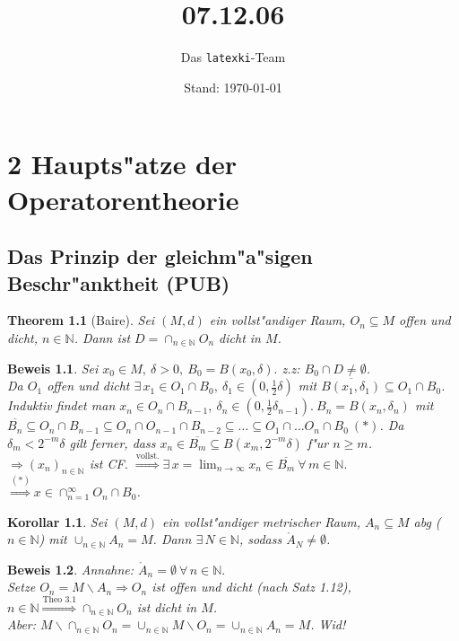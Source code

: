 \documentclass[a4paper,11pt]{book}
\title{07.12.06}
\author{Das \texttt{latexki}-Team\\[8 cm]}
\date{Stand: \today}
\newcommand{\N}{{\mathbb N}}
\newtheorem{Kor}[Def]{Korollar}
\newtheorem{Theo}[Def]{Theorem}
\theoremstyle{nonumberplain}
\newtheorem{Bew}{Beweis}
\begin{document}
\chapter{2 Haupts"atze der Operatorentheorie}

\section{Das Prinzip der gleichm"a"sigen Beschr"anktheit (PUB)}

\begin{Theo}[Baire]
Sei $(M,d)$ ein vollst"andiger Raum, $O_n \subseteq M$ offen und dicht, $n \in \N$. Dann ist $D = \cap_{n \in \N} O_n$ dicht in $M$.
\end{Theo}

\begin{Bew}
Sei $x_0 \in M,\ \delta > 0,\ B_0 = B(x_0,\delta).$ z.z: $B_0 \cap D \not= \emptyset$.\\
Da $O_1$ offen und dicht $\exists\, x_1 \in O_1 \cap B_0,\ \delta_1 \in (0,\frac12 \delta)$ mit $\overline{B(x_1,\delta_1)} \subseteq O_1 \cap B_0$. Induktiv findet man $x_n \in O_n \cap B_{n-1},\ \delta_n \in (0,\frac12 \delta_{n-1}).\ B_n = B(x_n,\delta_n)$ mit $\overline{B_n} \subseteq O_n \cap B_{n-1} \subseteq O_n \cap O_{n-1} \cap B_{n-2} \subseteq \dots \subseteq O_1 \cap \dots O_n \cap B_0\ (\ast)$. Da $\delta_m < 2^{-m} \delta$ gilt ferner, dass $x_n \in \overline{B_m} \subseteq B(x_m,2^{-m} \delta)$ f"ur $n \geq m$.\\
$\Rightarrow (x_n)_{n \in \N}$ ist CF. $\stackrel{\text{vollst.}}{\Longrightarrow} \exists\, x = \lim_{n \rightarrow \infty} x_n \in \overline{B_m} \ \forall\, m \in \N.$\\
$\stackrel{(\ast)}{\Rightarrow} x \in \cap_{n = 1}^{\infty} O_n \cap B_0$.
\end{Bew}

\begin{Kor}
Sei $(M,d)$ ein vollst"andiger metrischer Raum, $A_n \subseteq M$ abg ($n \in \N$) mit $\cup_{n \in \N} A_n = M$. Dann $\exists\, N \in \N$, sodass $\mathring{A}_N \not= \emptyset$.
\end{Kor}

\begin{Bew}
Annahne: $\mathring{A}_n = \emptyset \ \forall\, n \in \N.$\\
Setze $O_n = M \backslash A_n \Rightarrow O_n$ ist offen und dicht (nach Satz 1.12), $n \in \N \stackrel{\text{Theo 3.1}}{\Rightarrow} \cap_{n \in \N} O_n$ ist dicht in $M$.\\
Aber: $M \backslash \cap_{n \in \N} O_n = \cup_{n \in \N} M \backslash O_n = \cup_{n \in \N} A_n = M$. Wid!
\end{Bew}
\end{document}

